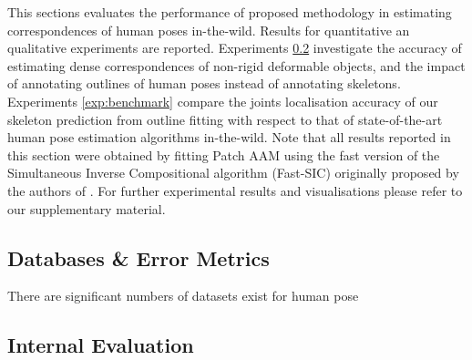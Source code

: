 This sections evaluates the performance of proposed methodology in estimating correspondences of human poses in-the-wild. Results for quantitative an qualitative experiments are reported. Experiments \ref{exp:internal} investigate the accuracy of estimating dense correspondences of non-rigid deformable objects, and the impact of annotating outlines of human poses instead of annotating skeletons. Experiments \ref{exp:benchmark} compare the joints localisation accuracy of our skeleton prediction from outline fitting with respect to that of state-of-the-art human pose estimation algorithms in-the-wild. Note that all results reported in this section were obtained by fitting Patch AAM using the fast version of the Simultaneous Inverse Compositional algorithm (Fast-SIC) originally proposed by the authors of \cite{Papandreou2008}. For further experimental results and visualisations please refer to our supplementary material.

\subsection{Databases \& Error Metrics}
There are significant numbers of datasets exist for human pose

\subsection{Internal Evaluation}
\label{exp:internal}

